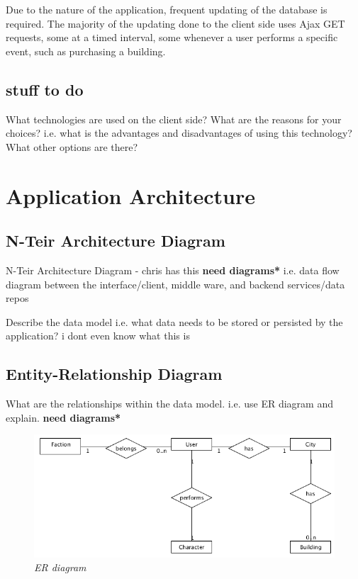 \documentclass{sig-alt-release2}
\begin{document}
Due to the nature of the application, frequent updating of the database is required. The majority of the updating done to the client side uses Ajax GET requests, some at a timed interval, some whenever a user performs a specific event, such as purchasing a building.

\subsection{stuff to do} 

What technologies are used on the client side? 
What are the reasons for your choices? i.e. what is the advantages and disadvantages of using this technology? 
What other options are there? 

\section{Application Architecture}

\subsection{N-Teir Architecture Diagram}

N-Teir Architecture Diagram - chris has this {\bf *need diagrams*} 
i.e. data flow diagram between the interface/client, middle ware, and backend services/data repos

Describe the data model i.e. what data needs to be stored or persisted by the application? i dont even know what this is

\subsection{Entity-Relationship Diagram}

What are the relationships within the data model.
i.e. use ER diagram and explain. {\bf *need diagrams*} 

\begin{figure}[!htbp]
  \caption{\textit{ER diagram}}
  \begin{center}
		\includegraphics[scale=0.40]{img/er.png}
  \end{center}
\end{figure}
\end{document}
